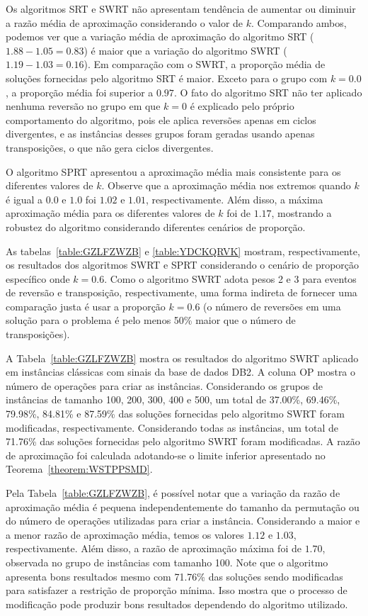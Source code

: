 Os algoritmos SRT e SWRT não apresentam tendência de aumentar ou diminuir a razão média de aproximação considerando o valor de $k$. Comparando ambos, podemos ver que a variação média de aproximação do algoritmo SRT ($1.88 - 1.05 = 0.83$) é maior que a variação do algoritmo SWRT ($1.19 - 1.03 = 0.16$). Em comparação com o SWRT, a proporção média de soluções fornecidas pelo algoritmo SRT é maior. Exceto para o grupo com $k = 0.0$, a proporção média foi superior a $0.97$. O fato do algoritmo SRT não ter aplicado nenhuma reversão no grupo em que $k = 0$ é explicado pelo próprio comportamento do algoritmo, pois ele aplica reversões apenas em ciclos divergentes, e as instâncias desses grupos foram geradas usando apenas transposições, o que não gera ciclos divergentes.

O algoritmo SPRT apresentou a aproximação média mais consistente para os diferentes valores de $k$. Observe que a aproximação média nos extremos quando $k$ é igual a $0.0$ e $1.0$ foi $1.02$ e $1.01$, respectivamente. Além disso, a máxima aproximação média para os diferentes valores de $k$ foi de $1.17$, mostrando a robustez do algoritmo considerando diferentes cenários de proporção.

As tabelas~\ref{table:GZLFZWZB} e \ref{table:YDCKQRVK} mostram, respectivamente, os resultados dos algoritmos SWRT e SPRT considerando o cenário de proporção específico onde $k=0.6$. Como o algoritmo SWRT adota pesos 2 e 3 para eventos de reversão e transposição, respectivamente, uma forma indireta de fornecer uma comparação justa é usar a proporção $k=0.6$ (o número de reversões em uma solução para o problema \SbPRT{} é pelo menos 50\% maior que o número de transposições).

A Tabela~\ref{table:GZLFZWZB} mostra os resultados do algoritmo SWRT aplicado em instâncias clássicas com sinais da base de dados DB2. A coluna OP mostra o número de operações para criar as instâncias. Considerando os grupos de instâncias de tamanho 100, 200, 300, 400 e 500, um total de 37.00\%, 69.46\%, 79.98\%, 84.81\% e 87.59\% das soluções fornecidas pelo algoritmo SWRT foram modificadas, respectivamente. Considerando todas as instâncias, um total de 71.76\% das soluções fornecidas pelo algoritmo SWRT foram modificadas. A razão de aproximação foi calculada adotando-se o limite inferior apresentado no Teorema~\ref{theorem:WSTPPSMD}.



Pela Tabela~\ref{table:GZLFZWZB}, é possível notar que a variação da razão de aproximação média é pequena independentemente do tamanho da permutação ou do número de operações utilizadas para criar a instância. Considerando a maior e a menor razão de aproximação média, temos os valores $1.12$ e $1.03$, respectivamente. Além disso, a razão de aproximação máxima foi de $1.70$, observada no grupo de instâncias com tamanho 100. Note que o algoritmo apresenta bons resultados mesmo com 71.76\% das soluções sendo modificadas para satisfazer a restrição de proporção mínima. Isso mostra que o processo de modificação pode produzir bons resultados dependendo do algoritmo utilizado.



